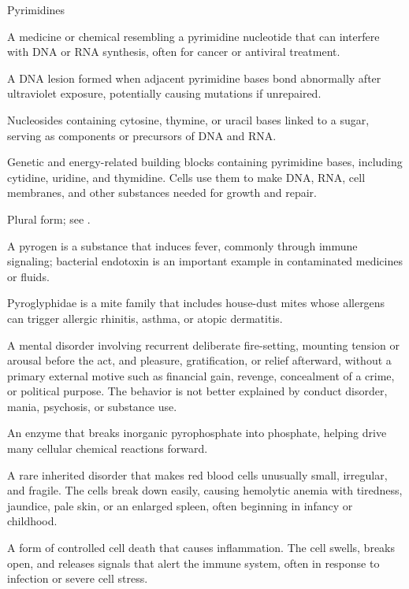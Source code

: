 \synonyms
Pyrimidines

 A medicine or chemical resembling a pyrimidine nucleotide that can interfere with DNA or RNA synthesis, often for cancer or antiviral treatment.

 A DNA lesion formed when adjacent pyrimidine bases bond abnormally after ultraviolet exposure, potentially causing mutations if unrepaired.

 Nucleosides containing cytosine, thymine, or uracil bases linked to a sugar, serving as components or precursors of DNA and RNA.

 Genetic and energy-related building blocks containing pyrimidine bases, including cytidine, uridine, and thymidine. Cells use them to make DNA, RNA, cell membranes, and other substances needed for growth and repair.

 Plural form; see .

 A pyrogen is a substance that induces fever, commonly through immune signaling; bacterial endotoxin is an important example in contaminated medicines or fluids.

 Pyroglyphidae is a mite family that includes house-dust mites whose allergens can trigger allergic rhinitis, asthma, or atopic dermatitis.

 A mental disorder involving recurrent deliberate fire-setting, mounting tension or arousal before the act, and pleasure, gratification, or relief afterward, without a primary external motive such as financial gain, revenge, concealment of a crime, or political purpose. The behavior is not better explained by conduct disorder, mania, psychosis, or substance use.

 An enzyme that breaks inorganic pyrophosphate into phosphate, helping drive many cellular chemical reactions forward.

 A rare inherited disorder that makes red blood cells unusually small, irregular, and fragile. The cells break down easily, causing hemolytic anemia with tiredness, jaundice, pale skin, or an enlarged spleen, often beginning in infancy or childhood.

 A form of controlled cell death that causes inflammation. The cell swells, breaks open, and releases signals that alert the immune system, often in response to infection or severe cell stress.

